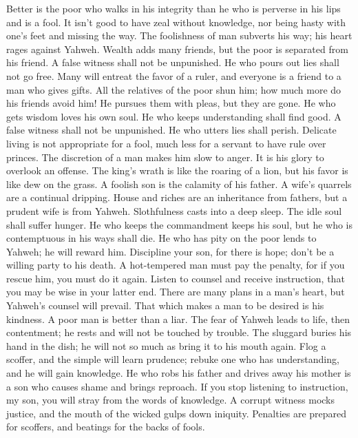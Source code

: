  Better is the poor who walks in his integrity than he who
is perverse in his lips and is a fool.  It isn't good to
have zeal without knowledge, nor being hasty with one's feet and missing
the way.  The foolishness of man subverts his way; his
heart rages against Yahweh.  Wealth adds many friends, but
the poor is separated from his friend.  A false witness
shall not be unpunished. He who pours out lies shall not go free.
 Many will entreat the favor of a ruler, and everyone is a
friend to a man who gives gifts.  All the relatives of the
poor shun him; how much more do his friends avoid him! He pursues them
with pleas, but they are gone.  He who gets wisdom loves
his own soul. He who keeps understanding shall find good. 
A false witness shall not be unpunished. He who utters lies shall
perish.  Delicate living is not appropriate for a fool,
much less for a servant to have rule over princes.  The
discretion of a man makes him slow to anger. It is his glory to overlook
an offense.  The king's wrath is like the roaring of a
lion, but his favor is like dew on the grass.  A foolish
son is the calamity of his father. A wife's quarrels are a continual
dripping.  House and riches are an inheritance from
fathers, but a prudent wife is from Yahweh.  Slothfulness
casts into a deep sleep. The idle soul shall suffer hunger.
 He who keeps the commandment keeps his soul, but he who
is contemptuous in his ways shall die.  He who has pity
on the poor lends to Yahweh; he will reward him. 
Discipline your son, for there is hope; don't be a willing party to his
death.  A hot-tempered man must pay the penalty, for if
you rescue him, you must do it again.  Listen to counsel
and receive instruction, that you may be wise in your latter end.
 There are many plans in a man's heart, but Yahweh's
counsel will prevail.  That which makes a man to be
desired is his kindness. A poor man is better than a liar.
 The fear of Yahweh leads to life, then contentment; he
rests and will not be touched by trouble.  The sluggard
buries his hand in the dish; he will not so much as bring it to his
mouth again.  Flog a scoffer, and the simple will learn
prudence; rebuke one who has understanding, and he will gain knowledge.
 He who robs his father and drives away his mother is a
son who causes shame and brings reproach.  If you stop
listening to instruction, my son, you will stray from the words of
knowledge.  A corrupt witness mocks justice, and the
mouth of the wicked gulps down iniquity.  Penalties are
prepared for scoffers, and beatings for the backs of fools.

